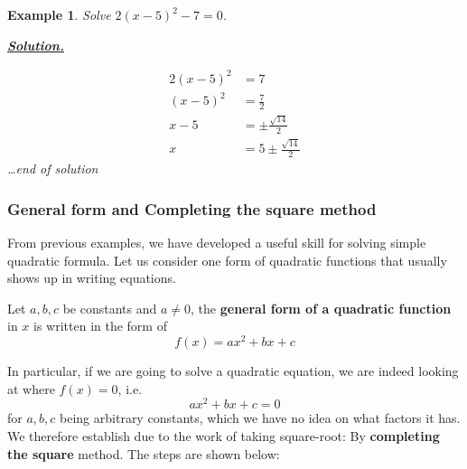 \documentclass[12pt]{article}
\newtheorem*{example}{Example}
\newenvironment{solution}{\begin{snugshade*} \underline{\textbf{Solution.}} \par}{\hfill \textit{\dots end of solution} \end{snugshade*}}
\begin{document}
    \begin{example}
        Solve $2(x-5)^2-7=0$.

        \begin{solution}
            \begin{align*}
                2(x-5)^2&=7\\
                (x-5)^2&=\frac{7}{2}\\
                x-5&=\pm\frac{\sqrt{14}}{2}\\
                x&=5\pm\frac{\sqrt{14}}{2}
            \end{align*}
        \end{solution}
    \end{example}

    \subsubsection*{General form and Completing the square method}

    From previous examples, we have developed a useful skill for solving simple quadratic formula. Let us consider one form of quadratic functions that usually shows up in writing equations.

    Let $a,b,c$ be constants and $a\neq 0$, the \textbf{general form of a quadratic function} in $x$ is written in the form of $$f(x)=ax^2+bx+c$$

    In particular, if we are going to solve a quadratic equation, we are indeed looking at where $f(x)=0$, i.e. $$ax^2+bx+c=0$$
    for $a,b,c$ being arbitrary constants, which we have no idea on what factors it has. We therefore establish due to the work of taking square-root: By \textbf{completing the square} method. The steps are shown below:
\end{document}
